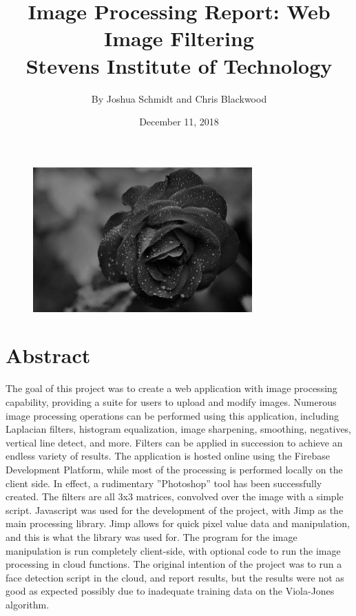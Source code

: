 \documentclass{article}
\title{%
    Image Processing Report: Web Image Filtering \\
    \large Stevens Institute of Technology}
\date{December 11, 2018}
\author{By Joshua Schmidt and Chris Blackwood}
\let\Oldsection\section
\renewcommand{\section}{\FloatBarrier\Oldsection}
\begin{document}
  \maketitle

  \bigskip
  \bigskip
  \bigskip
  \bigskip

  \begin{figure}[!htb]
    \centering
    \includegraphics[width=0.75\textwidth]{assets/logo.png}
    \label{fig:logo}
  \end{figure}

  \newpage

  \tableofcontents

  \newpage


  \section{Abstract}

  The goal of this project was to create a web application with image processing capability, providing a suite for users to upload and modify images. Numerous image processing operations can be performed using this application, including Laplacian filters, histogram equalization, image sharpening, smoothing, negatives, vertical line detect, and more. Filters can be applied in succession to achieve an endless variety of results. The application is hosted online using the Firebase Development Platform, while most of the processing is performed locally on the client side. In effect, a rudimentary ”Photoshop” tool has been successfully created. The filters are all 3x3 matrices, convolved over the image with a simple script. Javascript was used for the development of the project, with Jimp as the main processing library. Jimp allows for quick pixel value data and manipulation, and this is what the library was used for. The program for the image manipulation is run completely client-side, with optional code to run the image processing in cloud functions. The original intention of the project was to run a face detection script in the cloud, and report results, but the results were not as good as expected possibly due to inadequate training data on the Viola-Jones algorithm.  
\end{document}
